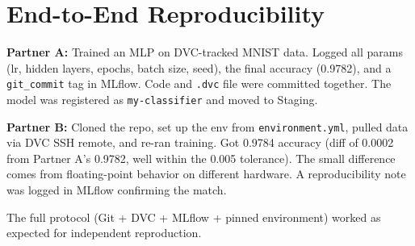 \documentclass[10pt, a4paper]{article}
\begin{document}
\section{End-to-End Reproducibility}

\textbf{Partner A:} Trained an MLP on DVC-tracked MNIST data. Logged all params (lr, hidden layers, epochs, batch size, seed), the final accuracy (0.9782), and a \texttt{git\_commit} tag in MLflow. Code and \texttt{.dvc} file were committed together. The model was registered as \texttt{my-classifier} and moved to Staging.

\textbf{Partner B:} Cloned the repo, set up the env from \texttt{environment.yml}, pulled data via DVC SSH remote, and re-ran training. Got 0.9784 accuracy (diff of 0.0002 from Partner A's 0.9782, well within the 0.005 tolerance). The small difference comes from floating-point behavior on different hardware. A reproducibility note was logged in MLflow confirming the match.

The full protocol (Git + DVC + MLflow + pinned environment) worked as expected for independent reproduction.
\end{document}
